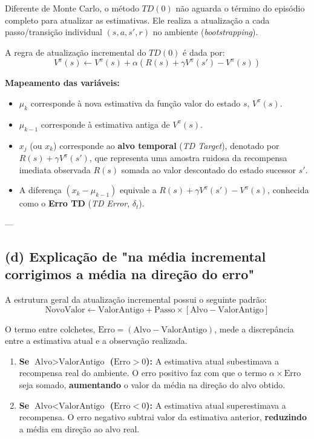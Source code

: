 \documentclass[a4paper,12pt]{article}
\begin{document}
Diferente de Monte Carlo, o método $TD(0)$ não aguarda o término do episódio completo para atualizar as estimativas. Ele realiza a atualização a cada passo/transição individual $(s, a, s', r)$ no ambiente (\textit{bootstrapping}).

A regra de atualização incremental do $TD(0)$ é dada por:
\begin{equation}
	V^\pi(s) \leftarrow V^\pi(s) + \alpha \left( R(s) + \gamma V^\pi(s') - V^\pi(s) \right)
\end{equation}

\textbf{Mapeamento das variáveis:}
\begin{itemize}
	\item $\mu_k$ corresponde à nova estimativa da função valor do estado $s$, $V^\pi(s)$.
	\item $\mu_{k-1}$ corresponde à estimativa antiga de $V^\pi(s)$.
	\item $x_j$ (ou $x_k$) corresponde ao \textbf{alvo temporal} (\textit{TD Target}), denotado por $R(s) + \gamma V^\pi(s')$, que representa uma amostra ruidosa da recompensa imediata observada $R(s)$ somada ao valor descontado do estado sucessor $s'$.
	\item A diferença $(x_k - \mu_{k-1})$ equivale a $R(s) + \gamma V^\pi(s') - V^\pi(s)$, conhecida como o \textbf{Erro TD} (\textit{TD Error}, $\delta_t$).
\end{itemize}

---

\subsection*{(d) Explicação de "na média incremental corrigimos a média na direção do erro"}

A estrutura geral da atualização incremental possui o seguinte padrão:
\begin{equation}
	\text{NovoValor} \leftarrow \text{ValorAntigo} + \text{Passo} \times \left[ \text{Alvo} - \text{ValorAntigo} \right]
\end{equation}

O termo entre colchetes, \textbf{$\text{Erro} = (\text{Alvo} - \text{ValorAntigo})$}, mede a discrepância entre a estimativa atual e a observação realizada.

\begin{enumerate}
	\item \textbf{Se $\text{Alvo} > \text{ValorAntigo}$ ($\text{Erro} > 0$):} A estimativa atual subestimava a recompensa real do ambiente. O erro positivo faz com que o termo $\alpha \times \text{Erro}$ seja somado, \textbf{aumentando} o valor da média na direção do alvo obtido.
	\item \textbf{Se $\text{Alvo} < \text{ValorAntigo}$ ($\text{Erro} < 0$):} A estimativa atual superestimava a recompensa. O erro negativo subtrai valor da estimativa anterior, \textbf{reduzindo} a média em direção ao alvo real.
\end{enumerate}
\end{document}
